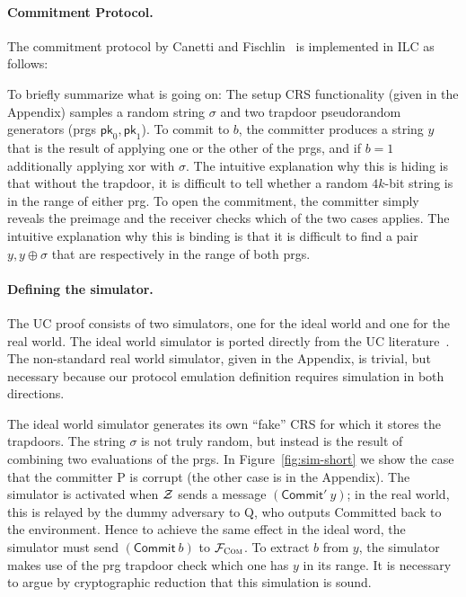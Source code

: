 \paragraph{Commitment Protocol.}
The commitment protocol by Canetti and Fischlin~\cite{canetti2001commitments} is
implemented in ILC as follows:

To briefly summarize what is going on: The setup CRS functionality (given in the
Appendix) samples a random string $\sigma$ and two trapdoor pseudorandom generators (prgs $\mathsf{pk}_0, \mathsf{pk}_1$).
To commit to $b$, the committer produces a string $y$ that is the result of applying one or the other of the prgs, and if $b=1$ additionally applying xor with $\sigma$.
The intuitive explanation why this is hiding is that without the trapdoor, it is difficult to tell whether a random $4k$-bit string is in the range of either prg. To open the commitment, the committer simply reveals the preimage and the receiver checks which of the two cases applies. The intuitive explanation why this is binding is that it is difficult to find a pair $y,y\oplus\sigma$ that are respectively in the range of both prgs.

\paragraph{Defining the simulator.}
The UC proof consists of two simulators, one for the ideal world and one for the real world.
The ideal world simulator is ported directly from the UC literature~\cite{canetti2001commitments}. The non-standard real world simulator, given in the Appendix, is trivial, but necessary because our protocol emulation definition requires simulation in both directions.

The ideal world simulator generates its own ``fake'' CRS for which it stores the trapdoors. The string $\sigma$ is not truly random, but instead is the result of combining two evaluations of the prgs. In Figure~\ref{fig:sim-short} we show the case that the committer P is corrupt (the other case is in the Appendix). The simulator is activated when $\mathcal{{Z}}$ sends a message $(\mathsf{Commit}' ~ y)$; in the real world, this is relayed by the dummy adversary to Q, who outputs \textsf{Committed} back to the environment. Hence to achieve the same effect in the ideal word, the simulator must send $(\mathsf{Commit}~b)$ to $\mathcal{{F}}_{\textsc{Com}}$. To extract $b$ from $y$, the simulator makes use of the prg trapdoor check which one has $y$ in its range.
It is necessary to argue by cryptographic reduction that this simulation is sound.


